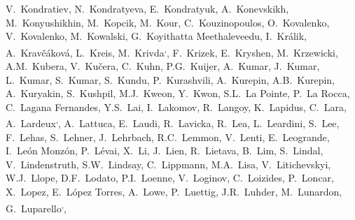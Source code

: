 \begin{flushleft}
V.~Kondratiev\And, 
N.~Kondratyeva\And, 
E.~Kondratyuk\And, 
A.~Konevskikh\And, 
M.~Konyushikhin\And, 
M.~Kopcik\And, 
M.~Kour\And, 
C.~Kouzinopoulos\And, 
O.~Kovalenko\And, 
V.~Kovalenko\And, 
M.~Kowalski\And, 
G.~Koyithatta Meethaleveedu\And, 
I.~Kr\'{a}lik\And, 
A.~Krav\v{c}\'{a}kov\'{a}\And, 
L.~Kreis\And, 
M.~Krivda\textsuperscript{,}\And, 
F.~Krizek\And, 
E.~Kryshen\And, 
M.~Krzewicki\And, 
A.M.~Kubera\And, 
V.~Ku\v{c}era\And, 
C.~Kuhn\And, 
P.G.~Kuijer\And, 
A.~Kumar\And, 
J.~Kumar\And, 
L.~Kumar\And, 
S.~Kumar\And, 
S.~Kundu\And, 
P.~Kurashvili\And, 
A.~Kurepin\And, 
A.B.~Kurepin\And, 
A.~Kuryakin\And, 
S.~Kushpil\And, 
M.J.~Kweon\And, 
Y.~Kwon\And, 
S.L.~La Pointe\And, 
P.~La Rocca\And, 
C.~Lagana Fernandes\And, 
Y.S.~Lai\And, 
I.~Lakomov\And, 
R.~Langoy\And, 
K.~Lapidus\And, 
C.~Lara\And, 
A.~Lardeux\textsuperscript{,}\And, 
A.~Lattuca\And, 
E.~Laudi\And, 
R.~Lavicka\And, 
R.~Lea\And, 
L.~Leardini\And, 
S.~Lee\And, 
F.~Lehas\And, 
S.~Lehner\And, 
J.~Lehrbach\And, 
R.C.~Lemmon\And, 
V.~Lenti\And, 
E.~Leogrande\And, 
I.~Le\'{o}n Monz\'{o}n\And, 
P.~L\'{e}vai\And, 
X.~Li\And, 
J.~Lien\And, 
R.~Lietava\And, 
B.~Lim\And, 
S.~Lindal\And, 
V.~Lindenstruth\And, 
S.W.~Lindsay\And, 
C.~Lippmann\And, 
M.A.~Lisa\And, 
V.~Litichevskyi\And, 
W.J.~Llope\And, 
D.F.~Lodato\And, 
P.I.~Loenne\And, 
V.~Loginov\And, 
C.~Loizides\And, 
P.~Loncar\And, 
X.~Lopez\And, 
E.~L\'{o}pez Torres\And, 
A.~Lowe\And, 
P.~Luettig\And, 
J.R.~Luhder\And, 
M.~Lunardon\And, 
G.~Luparello\textsuperscript{,}\And, 

\end{flushleft}
